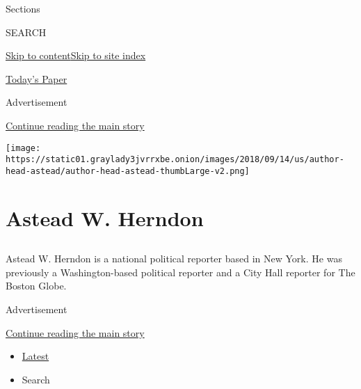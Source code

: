 Sections

SEARCH

\protect\hyperlink{site-content}{Skip to
content}\protect\hyperlink{site-index}{Skip to site index}

\href{https://myaccount.nytimes3xbfgragh.onion/auth/login?response_type=cookie\&client_id=vi}{}

\href{https://www.nytimes3xbfgragh.onion/section/todayspaper}{Today's
Paper}

Advertisement

\protect\hyperlink{after-top}{Continue reading the main story}

\texttt{[image: https://static01.graylady3jvrrxbe.onion/images/2018/09/14/us/author-head-astead/author-head-astead-thumbLarge-v2.png]}

\hypertarget{astead-w-herndon}{%
\section{Astead W. Herndon}\label{astead-w-herndon}}

\subsection{}

Astead W. Herndon is a national political reporter based in New York. He
was previously a Washington-based political reporter and a City Hall
reporter for The Boston Globe.

Advertisement

\protect\hyperlink{after-mid1}{Continue reading the main story}

\begin{itemize}
\tightlist
\item
  \protect\hyperlink{stream-panel}{Latest}
\item
  Search
\end{itemize}

